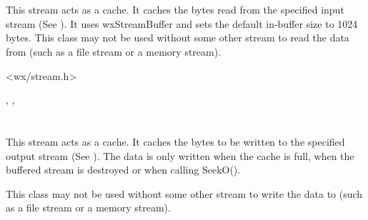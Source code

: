 \section{}\label{wxbufferedinputstream}

This stream acts as a cache. It caches the bytes read from the specified
input stream (See ).
It uses wxStreamBuffer and sets the default in-buffer size to 1024 bytes.
This class may not be used without some other stream to read the data
from (such as a file stream or a memory stream).




<wx/stream.h>




, ,

\section{}\label{wxbufferedoutputstream}

This stream acts as a cache. It caches the bytes to be written to the specified
output stream (See ). The
data is only written when the cache is full, when the buffered stream is
destroyed or when calling SeekO().

This class may not be used without some other stream to write the data
to (such as a file stream or a memory stream).




